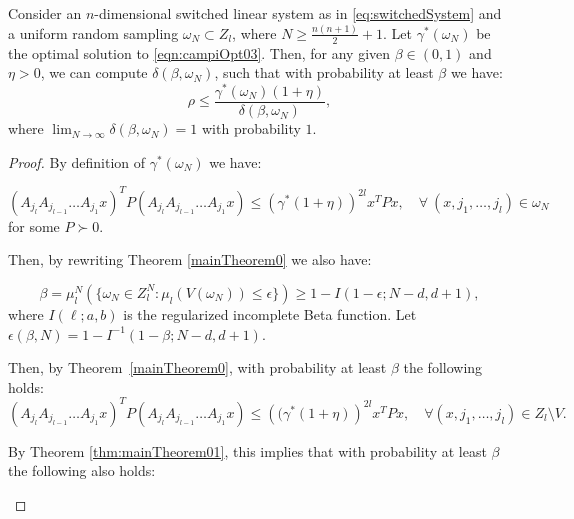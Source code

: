 
\begin{theorem}\label{thm:mainTheorem}
Consider an $n$-dimensional switched linear system as in \eqref{eq:switchedSystem} and a uniform random sampling $\omega_N \subset Z_l$, where $N \geq \frac{n(n+1)}{2}+1$. Let $\gamma^{*}(\omega_N) $ be the optimal solution to \eqref{eqn:campiOpt03}. Then, for any given $\beta \in (0,1)$ and $\eta > 0$, we can compute $\delta(\beta, \omega_N)$, such that with probability at least $\beta$ we have:
$$\rho \leq \frac{\gamma^{*}(\omega_N) (1+ \eta)}{\delta(\beta, \omega_N)},$$
where $\lim_{N \to \infty}\delta(\beta, \omega_N) = 1$ with probability $1$.
\end{theorem}


\begin{proof}

By definition of $\gamma^{*}(\omega_N)$ we have:

\begin{equation*} 
(A_{j_l} A_{j_{l-1}} \dots A_{j_1} x)^T P (A_{j_l} A_{j_{l-1}} \dots A_{j_1} x) \leq (\gamma^{*}(1+\eta))^{2l} x^T P x, \quad \forall\ (x, j_1, \dots, j_l)  \in \omega_N 
\end{equation*}
for some $P \succ 0$. 

Then, by rewriting Theorem \ref{mainTheorem0} we also have:

\begin{equation}\label{eqn:violation2}
\beta = \mu_l^N \left( \{ \omega_N \in Z_l^N: \mu_l(V(\omega_N)) \leq \epsilon \} \right) \geq 1- I(1-\epsilon; N-d, d+1),
\end{equation}
where $I(\ell;a,b)$ is the regularized incomplete Beta function. Let $\epsilon(\beta, N)=1- I^{-1}(1-\beta; N-d, d+1)$. 

Then, by Theorem~\ref{mainTheorem0}, with probability at least $\beta$ the following holds:
\begin{equation*} 
(A_{j_l} A_{j_{l-1}} \dots A_{j_1} x)^T P (A_{j_l} A_{j_{l-1}} \dots A_{j_1} x) \leq  \left((\gamma^{*}(1+\eta) \right)^{2l} x^T P x, \quad \forall (x, j_1, \dots, j_l) \in Z_l \setminus V.
\end{equation*}

By Theorem \ref{thm:mainTheorem01}, this implies that with probability at least $\beta$ the following also holds:

\begin{equation}
\end{equation}


\end{proof}
